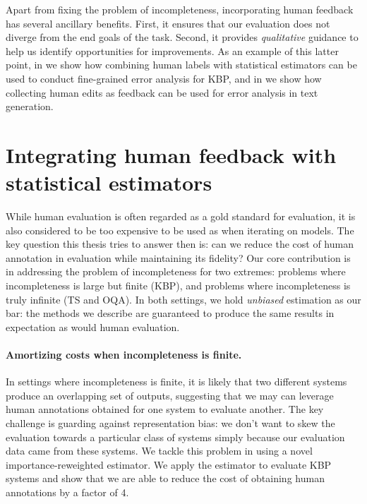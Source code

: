 Apart from fixing the problem of incompleteness, incorporating human feedback has several ancillary benefits.
First, it ensures that our evaluation does not diverge from the end goals of the task.
Second, it provides \textit{qualitative} guidance to help us identify opportunities for improvements.
As an example of this latter point, in  we show how combining human labels with statistical estimators can be used to conduct fine-grained error analysis for KBP, and in  we show how collecting human edits as feedback can be used for error analysis in text generation.


\section{Integrating human feedback with statistical estimators}
While human evaluation is often regarded as a gold standard for evaluation, it is also considered to be too expensive to be used as when iterating on models.
The key question this thesis tries to answer then is: can we reduce the cost of human annotation in evaluation while maintaining its fidelity?
Our core contribution is in addressing the problem of incompleteness for two extremes: problems where incompleteness is large but finite (KBP), and problems where incompleteness is truly infinite (TS and OQA).
In both settings, we hold \textit{unbiased} estimation as our bar: the methods we describe are guaranteed to produce the same results in expectation as would human evaluation.

\paragraph{Amortizing costs when incompleteness is finite.}
In settings where incompleteness is finite, it is likely that two different systems produce an overlapping set of outputs, suggesting that we may can leverage human annotations obtained for one system to evaluate another.
The key challenge is guarding against representation bias: we don't want to skew the evaluation towards a particular class of systems simply because our evaluation data came from these systems.
We tackle this problem in  using a novel importance-reweighted estimator. We apply the estimator to evaluate KBP systems and show that we are able to reduce the cost of obtaining human annotations by a factor of 4.

